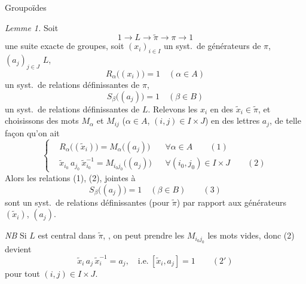 \documentclass[11pt,a4paper]{article}
\begin{document}

Groupoïdes

\emph{Lemme 1.} Soit
\[
1 \to L \longrightarrow \tilde{\pi} \longrightarrow \pi \longrightarrow 1
\]
une suite exacte de groupes, soit $(x_i)_{i \in I}$ un syst.\ de générateurs de $\pi$, $(a_j)_{j \in J}$  $L$,
\[
R_\alpha\bigl((x_i)\bigr) = 1 \quad (\alpha \in A)
\]
un syst.\ de relations définissantes de $\pi$,
\[
S_\beta\bigl((a_j)\bigr) = 1 \quad (\beta \in B)
\]
un syst.\ de relations définissantes de $L$. Relevons les $x_i$ en des $\tilde{x}_i \in \tilde{\pi}$, et choisissons des mots $M_\alpha$ et $M_{ij}$ ($\alpha \in A$, \struck{\ill{}} $(i,j) \in I \times J$) en des lettres $a_j$, de telle façon qu'on ait
\[
\left\{
\begin{aligned}
& R_\alpha\bigl((\tilde{x}_i)\bigr) = M_\alpha\bigl((a_j)\bigr) && \forall \alpha \in A \qquad (1) \\
& \tilde{x}_{i_0}\, a_{j_0}\, \tilde{x}_{i_0}^{-1} = M_{i_0 j_0}\bigl((a_j)\bigr) && \forall (i_0, j_0) \in I \times J \qquad (2)
\end{aligned}
\right.
\]
Alors les relations (1), (2), jointes à
\[
S_\beta\bigl((a_j)\bigr) = 1 \quad (\beta \in B) \qquad (3)
\]
sont un syst.\ de relations définissantes (pour $\tilde{\pi}$) par rapport aux générateurs $(\tilde{x}_i)$, $(a_j)$.


\emph{NB} Si $L$ est central dans $\tilde{\pi}$,  , on peut prendre les $M_{i_0 j_0}$ les mots vides, donc (2) devient
\[
\tilde{x}_i\, a_j\, \tilde{x}_i^{-1} = a_j, \quad \text{i.e.}\ [\tilde{x}_i, a_j] = 1 \qquad (2')
\]
pour tout $(i,j) \in I \times J$.

\end{document}
